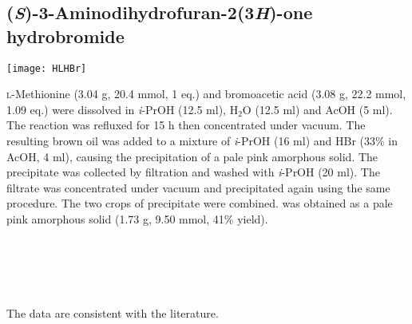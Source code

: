 \subsection{(\textit{S})-3-Aminodihydrofuran-2(3\textit{H})-one hydrobromide }


\begin{scheme}[H]
	\begin{center}
		\texttt{[image: HLHBr]}
	\end{center}
\end{scheme}

\textsc{l}-Methionine  (3.04 g, 20.4 mmol, 1 eq.) and bromoacetic acid  (3.08 g, 22.2 mmol, 1.09 eq.) were dissolved in \textit{i}-PrOH (12.5 ml), H$_2$O (12.5 ml) and AcOH (5 ml). The reaction was refluxed for 15 h then concentrated under vacuum. The resulting brown oil was added to a mixture of \textit{i}-PrOH (16 ml) and HBr (33\% in AcOH, 4 ml), causing the precipitation of a pale pink amorphous solid. The precipitate was collected by filtration and washed with \textit{i}-PrOH (20 ml). The filtrate was concentrated under vacuum and precipitated again using the same procedure. The two crops of precipitate were combined.  was obtained as a pale pink amorphous solid (1.73 g, 9.50 mmol, 41\% yield).
\\[1\baselineskip]
\\[1\baselineskip]
\\[1\baselineskip]
\\[1\baselineskip]
\\[1\baselineskip]
\\[1\baselineskip]
The data are consistent with the literature\cite{Stacy2013}.

